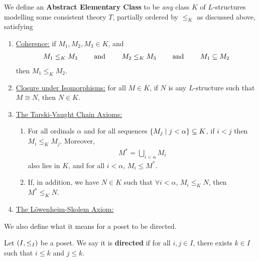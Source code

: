 \begin{boxdefinition}
    We define an \textbf{Abstract Elementary Class} to be \textit{any} class $K$ of $L$-structures modelling some consistent theory $T$, partially ordered by $\leq_K$ as discussed above, satisfying
    \begin{enumerate}
        \item \underline{Coherence:} if $M_1, M_2, M_3 \in K$, and
        \begin{align*}
            M_1 \leq_K M_3
            \qquad \text{ and } \qquad
            M_2 \leq_K M_3
            \qquad \text{ and } \qquad
            M_1 \subseteq M_2
        \end{align*}
        then $M_1 \leq_K M_2$.

        \item \underline{Closure under Isomorphisms:} for all $M \in K$, if $N$ is any $L$-structure such that $M \cong N$, then $N \in K$.

        \item \underline{The Tarski-Vaught Chain Axioms:}
        \begin{enumerate}
            \item For all ordinals $\alpha$ and for all sequences $\left\{ M_j \; \middle\vert \; j < \alpha \right\} \subseteq K$, if $i < j$ then $M_i \leq_K M_j$. Moreover,
            \begin{align*}
                M^{*} = \bigcup_{i < \alpha} M_i
            \end{align*}
            also lies in $K$, and for all $i < \alpha$, $M_i \leq M^*$.

            \item If, in addition, we have $N \in K$ such that $\forall i < \alpha$, $M_i \leq_K N$, then $M^* \leq_K N$.
        \end{enumerate}

        \item \underline{The Löwenheim-Skolem Axiom:} \sorry %
    \end{enumerate}
\end{boxdefinition}

We also define what it means for a poset to be directed.

\begin{boxdefinition}
    Let $\left( I, \leq_{I} \right)$ be a poset. We say it is \textbf{directed} if for all $i, j \in I$, there exists $k \in I$ such that $i \leq k$ and $j \leq k$.
\end{boxdefinition}


